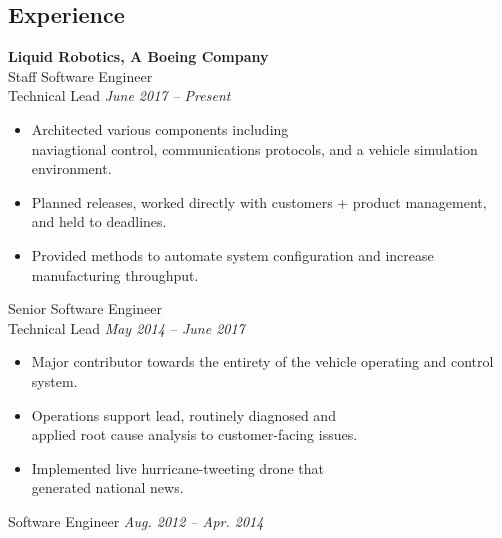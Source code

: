 \documentclass{article}
\begin{document}
{\begin{multicols}{2}
\section*{Experience}
\noindent
    \textbf{Liquid Robotics, A Boeing Company}\\
    Staff Software Engineer\\
    Technical Lead \hfill \textsl{June 2017 -- Present} \\
    \vspace{ -10px}
    \begin{itemize}[noitemsep,nolistsep]
        \item Architected various components including \\naviagtional control, communications protocols, and a vehicle simulation environment.
        \item Planned releases, worked directly with customers + product management, and held to deadlines.
        \item Provided methods to automate system configuration and increase manufacturing throughput.
    \end{itemize}
    \vspace{10px}
    Senior Software Engineer\\
    Technical Lead \hfill \textsl{May 2014 -- June 2017} \\
    \vspace{ -10px}
    \begin{itemize}[noitemsep,nolistsep]
    	\item Major contributor towards the entirety of the vehicle operating and control system.
         \item Operations support lead, routinely diagnosed and \\applied root cause analysis to customer-facing issues.
         \item Implemented live hurricane-tweeting drone that \\generated national news.
    \end{itemize}
    \vspace{10px}
    Software Engineer \hfill \textsl{Aug. 2012 -- Apr. 2014}\\
    \vspace{ -10px}
    \begin{itemize}

\end{itemize}
\end{multicols}}
\end{document}
